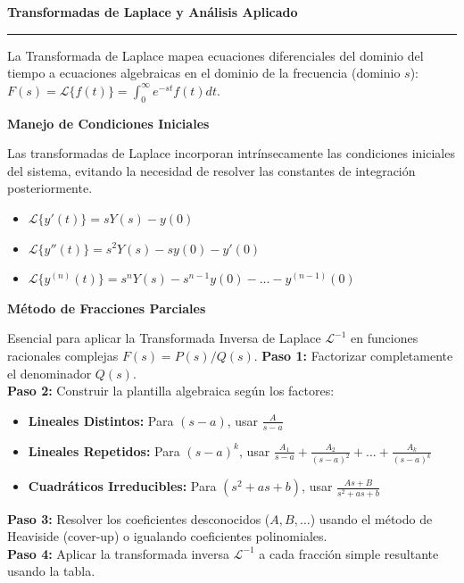 \documentclass[10pt, landscape, twocolumn]{article}
\newcommand{\cheatsheetsection}[1]{
    \vspace{0.6em}
    {\color{themeblue}\large\bfseries #1} \par
    \vspace{-0.5em}
    {\color{themeblue}\rule{\linewidth}{1pt}} \par
    \vspace{0.2em}
}
\newcommand{\cheatsheetsubsection}[1]{
    \vspace{0.4em}
    {\color{themeblue}\normalsize\bfseries #1} \par
    \vspace{0.1em}
}
\begin{document}
\newpage
\cheatsheetsection{Transformadas de Laplace y Análisis Aplicado}
La Transformada de Laplace mapea ecuaciones diferenciales del dominio del tiempo a ecuaciones algebraicas en el dominio de la frecuencia (dominio $s$): $F(s) = \mathcal{L}\{f(t)\} = \int_{0}^{\infty} e^{-st}f(t)dt$.

\cheatsheetsubsection{Manejo de Condiciones Iniciales}
Las transformadas de Laplace incorporan intrínsecamente las condiciones iniciales del sistema, evitando la necesidad de resolver las constantes de integración posteriormente.
\begin{itemize}[leftmargin=*, nosep]
    \item $\mathcal{L}\{y'(t)\} = sY(s) - y(0)$
    \item $\mathcal{L}\{y''(t)\} = s^2Y(s) - sy(0) - y'(0)$
    \item $\mathcal{L}\{y^{(n)}(t)\} = s^nY(s) - s^{n-1}y(0) - \dots - y^{(n-1)}(0)$
\end{itemize}

\cheatsheetsubsection{Método de Fracciones Parciales}
Esencial para aplicar la Transformada Inversa de Laplace $\mathcal{L}^{-1}$ en funciones racionales complejas $F(s) = P(s)/Q(s)$.
\textbf{Paso 1:} Factorizar completamente el denominador $Q(s)$. \\
\textbf{Paso 2:} Construir la plantilla algebraica según los factores:
\begin{itemize}[leftmargin=*, nosep]
    \item \textbf{Lineales Distintos:} Para $(s-a)$, usar $\frac{A}{s-a}$
    \item \textbf{Lineales Repetidos:} Para $(s-a)^k$, usar $\frac{A_1}{s-a} + \frac{A_2}{(s-a)^2} + \dots + \frac{A_k}{(s-a)^k}$
    \item \textbf{Cuadráticos Irreducibles:} Para $(s^2+as+b)$, usar $\frac{As+B}{s^2+as+b}$
\end{itemize}
\textbf{Paso 3:} Resolver los coeficientes desconocidos ($A, B, \dots$) usando el método de Heaviside (cover-up) o igualando coeficientes polinomiales. \\
\textbf{Paso 4:} Aplicar la transformada inversa $\mathcal{L}^{-1}$ a cada fracción simple resultante usando la tabla.
\end{document}
